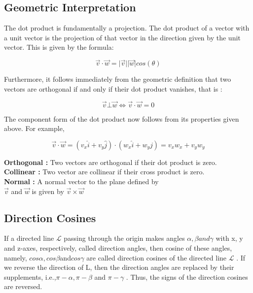 \documentclass[12pt]{report}
\begin{document}
\subsection{Geometric Interpretation}

The dot product is fundamentally a projection. The dot product of a vector with a unit vector is the projection of that vector in the direction given by the unit vector. This is given by the formula:

\[ \overrightarrow{v} \cdot \overrightarrow{w} = \vert \overrightarrow{v} \vert \vert \overrightarrow{w} \vert  cos (\theta) \]


Furthermore, it follows immediately from the geometric definition that two vectors are orthogonal if and only if their dot product vanishes, that is : 

\[ \overrightarrow{v} \bot \overrightarrow{w} \Leftrightarrow \overrightarrow{v} \cdot \overrightarrow{w} = 0 \]


The component form of the dot product now follows from its properties given above. For example, 

\[ \overrightarrow{v} \cdot \overrightarrow{w} = ( v_{x} \widehat{i} + v_{y} \widehat{j}) \cdot ( w_{x} \widehat{i} + w_{y} \widehat{j}) = v_{x}w_{x} + v_{y}w_{y} \] 

\indent \textbf{Orthogonal : } Two vectors are orthogonal if their dot product is zero.  \\
\indent \textbf{Collinear : } Two vector are collinear if their cross product is zero.  \\
\indent \textbf{Normal : } A normal vector to the plane defined by\\
$\overrightarrow{v}  $ and $ \overrightarrow{w}$ is given by  $\overrightarrow{v} \times \overrightarrow{w}  $

\subsection{Direction Cosines}


If a directed line $\mathcal{L}$ passing through the origin makes angles $\alpha, \beta and \gamma$ with x, y and z-axes, respectively, called direction angles, then cosine of these angles, namely, $cos \alpha, cos \beta $and$ cos \gamma$ are called direction cosines of the directed line $\mathcal{L}$ . If we reverse the direction of L, then the direction angles are replaced by their supplements, i.e.,$ \pi - \alpha , \pi - \beta$ and $\pi - \gamma$ . Thus, the signs of the direction cosines are reversed. 
\end{document}
